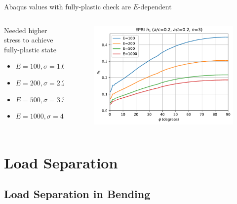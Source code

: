 \begin{frame}
Abaqus \hone values with fully-plastic check are \(E\)-dependent
\begin{columns}
\begin{column}{0.45\textwidth}
Needed higher stress to achieve fully-plastic state
\begin{itemize}
\item \(E=100, \sigma=1.64\)
\item \(E=200, \sigma=2.27\)
\item \(E=500, \sigma=3.36\)
\item \(E=1000, \sigma=4.41\)
\end{itemize}

\end{column}
\begin{column}{0.45\textwidth}
\begin{figure}[tbp]
\centering
\includegraphics[width=\columnwidth]{bend_ac02_at02_n03_phi_h1}
\end{figure}
\end{column}
\end{columns}
\end{frame}

\section{Load Separation}

\subsection{Load Separation in Bending}

